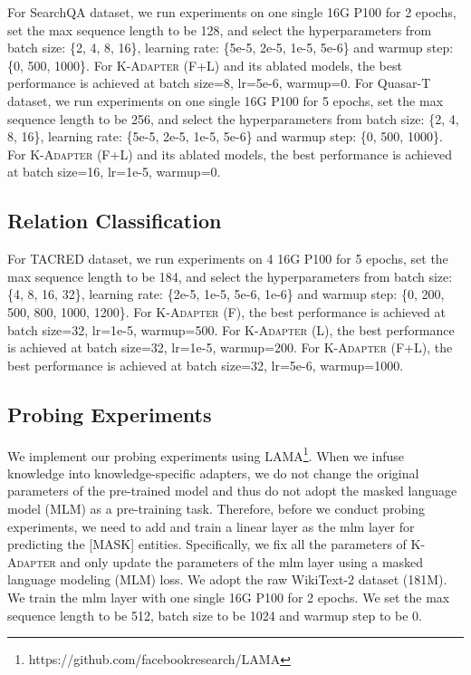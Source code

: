 \documentclass[11pt,a4paper]{article}
\begin{document}
For SearchQA dataset, we run experiments on one single 16G P100 for 2 epochs, set the max sequence length to be 128, and select the hyperparameters from batch size: \{2, 4, 8, 16\}, learning rate: \{5e-5,  2e-5, 1e-5, 5e-6\} and warmup step: \{0, 500, 1000\}. 
For \textsc{K-Adapter} (F+L) and its ablated models, the best performance is achieved at batch size=8, lr=5e-6, warmup=0. For Quasar-T dataset, we run experiments on one single 16G P100 for 5 epochs, set the max sequence length to be 256, and select the hyperparameters from batch size: \{2, 4, 8, 16\}, learning rate: \{5e-5, 2e-5, 1e-5, 5e-6\} and warmup step: \{0, 500, 1000\}. For \textsc{K-Adapter} (F+L) and its ablated models, the best performance is achieved at batch size=16, lr=1e-5, warmup=0. 


\subsection{Relation Classification}


For TACRED dataset, we run experiments on 4 16G P100 for 5 epochs, set the max sequence length to be 184, and select the hyperparameters from batch size: \{4, 8, 16, 32\}, learning rate: \{2e-5, 1e-5, 5e-6, 1e-6\} and warmup step: \{0, 200, 500, 800, 1000, 1200\}. 
For \textsc{K-Adapter} (F), the best performance is achieved at batch size=32, lr=1e-5, warmup=500.
For \textsc{K-Adapter} (L), the best performance is achieved at batch size=32, lr=1e-5, warmup=200.
For \textsc{K-Adapter} (F+L), the best performance is achieved at batch size=32, lr=5e-6, warmup=1000.

\subsection{Probing Experiments}
\label{probing_experiments_details}
We implement our probing experiments using LAMA\footnote{https://github.com/facebookresearch/LAMA}.  When we infuse knowledge into knowledge-specific adapters, we do not change the original parameters of the pre-trained model and thus do not adopt the masked language model (MLM) as a pre-training task. Therefore, before we conduct probing experiments, we need to add and train a linear layer as the mlm layer for predicting the [MASK] entities. Specifically, we fix all the parameters of \textsc{K-Adapter} and only update the parameters of the mlm layer using a masked language modeling (MLM) loss. We adopt the raw WikiText-2 dataset (181M). We train the mlm layer with one single 16G P100 for 2 epochs. We set the max sequence length to be 512, batch size to be 1024 and warmup step to be 0.
\end{document}
